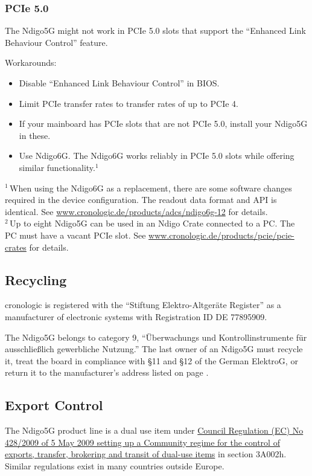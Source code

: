 \subsubsection{PCIe 5.0}
The Ndigo5G might not work in PCIe 5.0 slots that support the ``Enhanced Link Behaviour Control'' feature.\par
Workarounds:
\begin{itemize}
    \item Disable ``Enhanced Link Behaviour Control'' in BIOS.
    \item Limit PCIe transfer rates to transfer rates of up to PCIe 4.
    \item If your mainboard has PCIe slots that are not PCIe 5.0, install your Ndigo5G in these.
    \item Use Ndigo6G. The Ndigo6G works reliably in PCIe 5.0 slots while offering similar functionality.$^1$
\end{itemize}
{\small $^1$\,When using the Ndigo6G as a replacement, there are some software changes required in the device configuration. The readout data format and API is identical. See \href{https://www.cronologic.de/products/adcs/ndigo6g-12}{www.cronologic.de/products/adcs/ndigo6g-12} for details.}\\
{\small $^2$\,Up to eight Ndigo5G can be used in an Ndigo Crate connected to a PC. The PC must have a vacant PCIe slot. See \href{https://www.cronologic.de/products/pcie/pcie-crates}{www.cronologic.de/products/pcie/pcie-crates} for details.}


\subsection{Recycling}

    cronologic is registered with the ``Stiftung Elektro-Altger\"a{}te Register'' as a manufacturer of electronic systems with Registration ID DE 77895909.\par

    The Ndigo5G belongs to category 9, ``\"U{}berwachungs und Kontrollinstrumente f\"u{}r aus\-schlie\ss lich gewerbliche Nutzung.'' The last owner of an Ndigo5G must recycle it, treat the board in compliance with \S{}11 and \S{}12 of the German ElektroG, or return it to the manufacturer's address listed on page \pageref{cp:manu}.

\subsection{Export Control}
The Ndigo5G product line is a dual use item under \href{https://eur-lex.europa.eu/eli/reg/2009/428/oj}{Council Regulation (EC) No 428/2009 of 5 May 2009 setting up a Community regime for the control of exports, transfer, brokering and transit of dual-use items} in section 3A002h. Similar regulations exist in many countries outside Europe.

